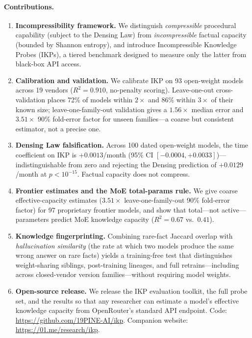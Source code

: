 \documentclass[11pt]{article}
\begin{document}
\paragraph{Contributions.}
\begin{enumerate}[leftmargin=*]
    \item \textbf{Incompressibility framework.} We distinguish \emph{compressible} procedural capability (subject to the Densing Law) from \emph{incompressible} factual capacity (bounded by Shannon entropy), and introduce Incompressible Knowledge Probes (IKPs), a tiered benchmark designed to measure only the latter from black-box API access.
    \item \textbf{Calibration and validation.} We calibrate IKP on 93 open-weight models across 19 vendors ($R^2 = 0.910$, no-penalty scoring). Leave-one-out cross-validation places 72\% of models within $2\times$ and 86\% within $3\times$ of their known size; leave-one-family-out validation gives a $1.56\times$ median error and $3.51\times$ 90\% fold-error factor for unseen families---a coarse but consistent estimator, not a precise one.
    \item \textbf{Densing Law falsification.} Across 100 dated open-weight models, the time coefficient on IKP is $+0.0013$/month (95\% CI $[-0.0004, +0.0033]$)---indistinguishable from zero and rejecting the Densing prediction of $+0.0129$/month at $p < 10^{-15}$. Factual capacity does not compress.
    \item \textbf{Frontier estimates and the MoE total-params rule.} We give coarse effective-capacity estimates ($3.51\times$ leave-one-family-out 90\% fold-error factor) for 97 proprietary frontier models, and show that total---not active---parameters predict MoE knowledge capacity ($R^2 = 0.67$ vs.\ $0.41$).
    \item \textbf{Knowledge fingerprinting.} Combining rare-fact Jaccard overlap with \emph{hallucination similarity} (the rate at which two models produce the same wrong answer on rare facts) yields a training-free test that distinguishes weight-sharing siblings, post-training lineages, and full retrains---including across closed-vendor version families---without requiring model weights.
    \item \textbf{Open-source release.} We release the IKP evaluation toolkit, the full probe set, and the results so that any researcher can estimate a model's effective knowledge capacity from OpenRouter's standard API endpoint. Code: \url{https://github.com/19PINE-AI/ikp}. Companion website: \url{https://01.me/research/ikp}.
\end{enumerate}
\end{document}
